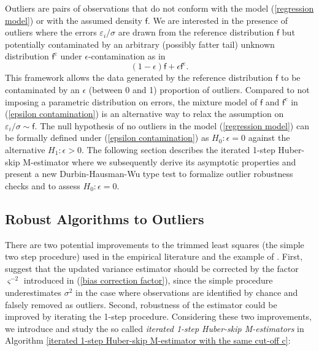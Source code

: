 \documentclass[11pt, letterpaper]{article}
\numberwithin{algorithm}{section}
\numberwithin{assumption}{section}
\numberwithin{lemma}{section}
\numberwithin{theorem}{section}
\numberwithin{corollary}{section}
\numberwithin{remark}{section}
\numberwithin{equation}{section}
\numberwithin{figure}{section}
\numberwithin{table}{section}
\begin{document}
Outliers are pairs of observations that do not conform with the model (\ref{regression model}) or with the assumed density $\mathsf{f}$. We are interested in the presence of outliers where the errors $\varepsilon_{i} / \sigma$ are drawn from the reference distribution $\mathsf{f}$ but potentially contaminated by an arbitrary (possibly fatter tail) unknown distribution $\mathsf{f}^{\mathrm{c}}$ under $\epsilon$-contamination as in \cite{huber1964robust}
\begin{equation} \label{epsilon contamination}
(1 - \epsilon) \mathsf{f} + \epsilon \mathsf{f}^{\mathrm{c}}.
\end{equation}
This framework allows the data generated by the reference distribution $\mathsf{f}$ to be contaminated by an $\epsilon$ (between 0 and 1) proportion of outliers. Compared to not imposing a parametric distribution on errors, the mixture model of $\mathsf{f}$ and $\mathsf{f}^{\mathrm{c}}$ in (\ref{epsilon contamination}) is an alternative way to relax the assumption on $\varepsilon_{i} / \sigma \sim \mathsf{f}$. The null hypothesis of no outliers in the model (\ref{regression model}) can be formally defined under (\ref{epsilon contamination}) as $H_{0}: \epsilon = 0$ against the alternative $H_{1}: \epsilon > 0$. The following section describes the iterated 1-step Huber-skip M-estimator where we subsequently derive its asymptotic properties and present a new Durbin-Hausman-Wu type test to formalize outlier robustness checks and to assess $H_{0}: \epsilon = 0$.


\subsection{Robust Algorithms to Outliers} \label{sec_algorithm}
There are two potential improvements to the trimmed least squares (the simple two step procedure) used in the empirical literature and the example of \cite{acemoglu2019democracy}. First, \cite{johansen2009analysis} suggest that the updated variance estimator should be corrected by the factor $\varsigma^{-2}$ introduced in (\ref{bias correction factor}), since the simple procedure underestimates $\sigma^{2}$ in the case where observations are identified by chance and falsely removed as outliers. Second, robustness of the estimator could be improved by iterating the 1-step procedure. Considering these two improvements, we introduce and study the so called \emph{iterated 1-step Huber-skip M-estimators} in Algorithm \ref{iterated 1-step Huber-skip M-estimator with the same cut-off c}:
\end{document}

